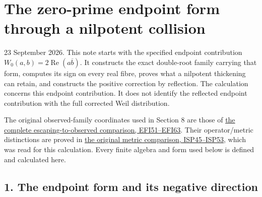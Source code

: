 \documentclass[
  10pt,
  a4paper,
]{article}
\author{}
\date{}
\begin{document}
{
\setcounter{tocdepth}{3}
\tableofcontents
}
\section{The zero-prime endpoint form through a nilpotent
collision}\label{the-zero-prime-endpoint-form-through-a-nilpotent-collision}

23 September 2026. This note starts with the specified endpoint
contribution \(W_0(a,b)=2\operatorname{Re}(a\overline b)\). It
constructs the exact double-root family carrying that form, computes its
sign on every real fibre, proves what a nilpotent thickening can retain,
and constructs the positive correction by reflection. The calculation
concerns this endpoint contribution. It does not identify the reflected
endpoint contribution with the full corrected Weil distribution.

The original observed-family coordinates used in Section 8 are those of
\href{https://github.com/KokunoYumeto/zeta-function-research-reader/blob/173dbc6ed5a03235dbe7654f928f3692107db39b/workbenches/splitzero-tandem/branches/tau-zero-prime-positivity/ESCAPING_FIBRE_INFINITESIMAL_DERIVATION.md}{the
complete escaping-to-observed comparison, EFI51--EFI63}. Their
operator/metric distinctions are proved in
\href{https://github.com/KokunoYumeto/zeta-function-research-reader/blob/173dbc6ed5a03235dbe7654f928f3692107db39b/workbenches/splitzero-tandem/branches/tau-zero-prime-positivity/INFINITESIMAL_SUPPORT_POSITIVITY_DERIVATION.md}{the
original metric comparison, ISP45--ISP53}, which was read for this
calculation. Every finite algebra and form used below is defined and
calculated here.

\subsection{1. The endpoint form and its negative
direction}\label{the-endpoint-form-and-its-negative-direction}
\end{document}
